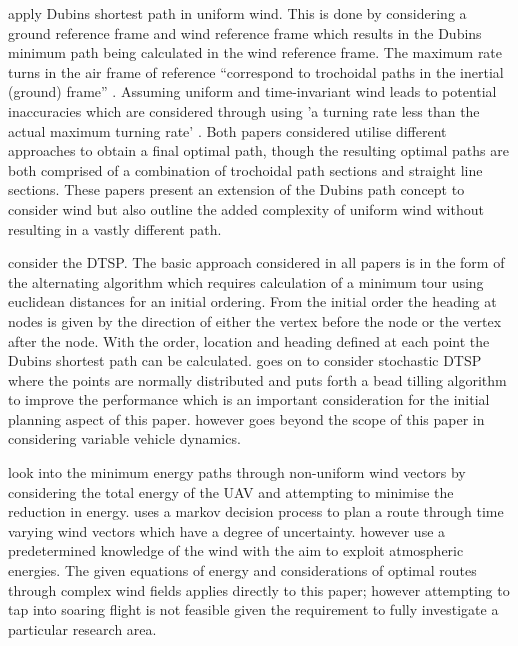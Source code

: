 \documentclass[a4paper,12pt,twoside]{article}
\begin{document}
 apply Dubins shortest path in uniform wind. This is done by considering a ground reference frame and wind reference frame which results in the Dubins minimum path being calculated in the wind reference frame. The maximum rate turns in the air frame of reference ``correspond to trochoidal paths in the inertial (ground) frame'' \cite{Techy2009}. Assuming uniform and time-invariant wind leads to potential inaccuracies which are considered through using 'a turning rate less than the actual maximum turning rate' \cite{McGee2005}. Both papers considered utilise different approaches to obtain a final optimal path, though the resulting optimal paths are both comprised of a combination of trochoidal path sections and straight line sections. These papers present an extension of the Dubins path concept to consider wind but also outline the added complexity of uniform wind without resulting in a vastly different path.

 consider the DTSP. The basic approach considered in all papers is in the form of the alternating algorithm which requires calculation of a minimum tour using euclidean distances for an initial ordering. From the initial order the heading at nodes is given by the direction of either the vertex before the node or the vertex after the node. With the order, location and heading defined at each point the Dubins shortest path can be calculated.  goes on to consider stochastic DTSP where the points are normally distributed and puts forth a bead tilling algorithm to improve the performance which is an important consideration for the initial planning aspect of this paper.  however goes beyond the scope of this paper in considering variable vehicle dynamics.

 look into the minimum energy paths through non-uniform wind vectors by considering the total energy of the UAV and attempting to minimise the reduction in energy.  uses a markov decision process to plan a route through time varying wind vectors which have a degree of uncertainty.  however use a predetermined knowledge of the wind with the aim to exploit atmospheric energies. The given equations of energy and considerations of optimal routes through complex wind fields applies directly to this paper; however attempting to tap into soaring flight is not feasible given the requirement to fully investigate a particular research area.
\end{document}
